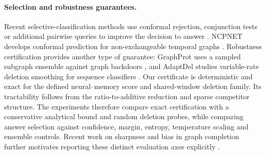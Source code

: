 \paragraph{Selection and robustness guarantees.}
Recent selective-classification methods use conformal rejection, conjunction tests or additional pairwise queries to improve the decision to answer \citep{szabadvary2025reject,he2025conjunction,vardhan2026pairwise}. NCPNET develops conformal prediction for non-exchangeable temporal graphs \citep{wang2025nonexchangeable}. Robustness certification provides another type of guarantee: GraphProt uses a sampled subgraph ensemble against graph backdoors \citep{yang2025graphprot}, and AdaptDel studies variable-rate deletion smoothing for sequence classifiers \citep{huang2025adaptdel}. Our certificate is deterministic and exact for the defined neural--memory score and shared-window deletion family. Its tractability follows from the ratio-to-additive reduction and sparse competitor structure. The experiments therefore compare exact certification with a conservative analytical bound and random deletion probes, while comparing answer selection against confidence, margin, entropy, temperature scaling and ensemble controls. Recent work on sharpness and bias in graph completion further motivates reporting these distinct evaluation axes explicitly \citep{moon2026sharpness}.
